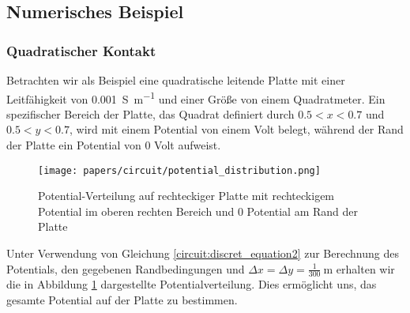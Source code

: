 \subsection{Numerisches Beispiel} 
\subsubsection{Quadratischer Kontakt}
Betrachten wir als Beispiel eine quadratische leitende Platte mit
einer Leitfähigkeit von \SI{0.001}{\siemens\per\meter} und einer
Größe von einem Quadratmeter. Ein spezifischer Bereich der Platte,
das Quadrat definiert durch $0.5 < x < 0.7$ und $0.5 < y < 0.7$,
wird mit einem Potential von einem Volt belegt, während der Rand
der Platte ein Potential von 0 Volt aufweist.

\begin{figure}
	\centering
	\texttt{[image: papers/circuit/potential\_distribution.png]}
	\caption{Potential-Verteilung auf rechteckiger Platte mit rechteckigem Potential im oberen rechten Bereich und 0 Potential am Rand der Platte \cite{github:AndreasFMueller}}
	\label{fig:potential_distribution}
\end{figure}
Unter Verwendung von Gleichung \eqref{circuit:discret_equation2}
zur Berechnung des Potentials, den gegebenen Randbedingungen und
$\Delta x = \Delta y = \frac{1}{300}\SI{}{\meter}$ erhalten wir die
in Abbildung \ref{fig:potential_distribution} dargestellte
Potentialverteilung. Dies ermöglicht uns, das gesamte Potential auf
der Platte zu bestimmen.

